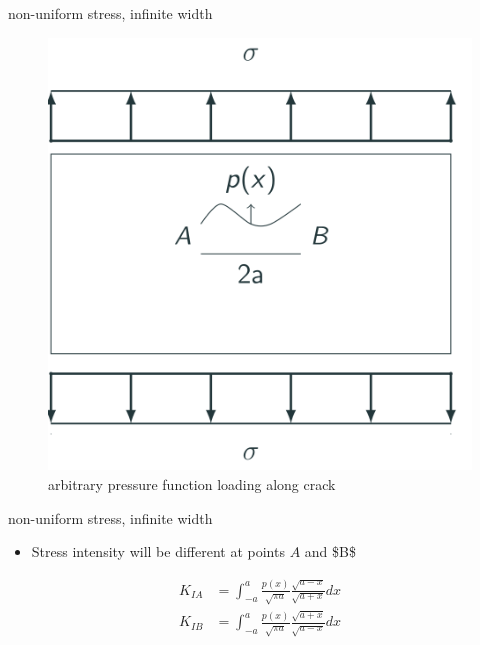 \documentclass[
  letterpaper,
  ignorenonframetext,
  aspectratio=43,
  handout,
  12pt]{beamer}
\providecommand{\tightlist}{%
  \setlength{\itemsep}{0pt}\setlength{\parskip}{0pt}}
\providecommand{\tightlist}{%
\setlength{\itemsep}{0pt}\setlength{\parskip}{0pt}}
\let\Oldincludegraphics\includegraphics
\renewcommand{\includegraphics}[2][]{\Oldincludegraphics[width=\textwidth,height=0.7\textheight,keepaspectratio]{#2}}
\begin{document}
\begin{frame}{non-uniform stress, infinite width}
\protect\hypertarget{non-uniform-stress-infinite-width}{}
\begin{figure}
\centering
\includegraphics{../images/pressure-function.svg}
\caption{arbitrary pressure function loading along crack}
\end{figure}
\end{frame}

\begin{frame}{non-uniform stress, infinite width}
\protect\hypertarget{non-uniform-stress-infinite-width-1}{}
\begin{itemize}
\tightlist
\item
  Stress intensity will be different at points \(A\) and \$B\$
\end{itemize}

\[\begin{aligned}
    K_{IA} &= \int_{-a}^{a} \frac{p(x)}{\sqrt{\pi a}}\frac{\sqrt{a-x}}{\sqrt{a+x}}dx\\
    K_{IB} &= \int_{-a}^{a} \frac{p(x)}{\sqrt{\pi a}}\frac{\sqrt{a+x}}{\sqrt{a-x}}dx
\end{aligned}\]
\end{frame}
\end{document}
